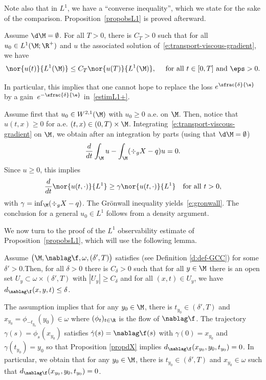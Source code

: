 Note also that in $L^1$, we have a ``converse inequality'', which we state for the sake of the comparison. Proposition~\ref{propobsL1} is proved afterward.
\begin{lemma}
\label{l:reverse-heat}
Assume $\d\M = \emptyset$. For all $T>0$, there is $C_T>0$ such that for all $u_0\in L^1(\M; \R^+)$ and $u$ the associated solution of~\eqref{e:transport-viscous-gradient}, we have
\begin{equation}
\label{e:gronwall}
\nor{u(t)}{L^1(\M)}\leq C_T \nor{u(T)}{L^1(\M)}, \quad \text{ for all } t \in [0,T] \text{ and }\eps >0.
\end{equation}
\end{lemma}
In particular, this implies that one cannot hope to replace the loss $e^{\sfrac{\delta}{\e}}$ by a gain~$e^{-\sfrac{\delta}{\e}}$ in~\eqref{estimL1+}.

Assume first that $u_0 \in W^{2,1}(\M)$ with $u_0\geq 0$ a.e. on $\M$. Then, notice that $u(t,x)\geq 0$ for a.e. $(t,x) \in (0,T) \times \M$.
Integrating~\eqref{e:transport-viscous-gradient} on $\M$, we obtain after an integration by parts (using that $\d\M = \emptyset$)
\[
\frac{d}{dt} \int_\M u - \int_\M (\div_gX - q ) u = 0.
\]
Since $u\geq 0$, this implies
\[
\frac{d}{dt} \nor{u(t,\cdot)}{L^1} \geq \gamma \nor{u(t,\cdot)}{L^1}\quad \text{for all }t>0,
\]
with $\gamma = \inf_\M (\div_gX - q )$. The Grönwall inequality yields~\eqref{e:gronwall}. The conclusion for a general $u_0 \in L^1$ follows from a density argument.
\enp

We now turn to the proof of the $L^1$ observability estimate of Proposition~\ref{propobsL1}, which will use the following lemma.
\begin{lemma}
\label{l:pourri}
Assume $\big( \M, \nablag\f,\omega,(\delta',T)\big)$ satisfies \pGCC (see Definition \ref{d:def-GCC}) for some $\delta'>0$.Then, for all $\delta>0$ there is $C_\delta>0$ such that for all $y \in \M$ there is an open set $U_y \subset \omega \times (\delta',T)$ with $|U_y| \geq C_\delta$ and for all $(x,t)\in U_y$, we have $d_{\nablag \f}(x,y,t)\leq \delta$.
\end{lemma}
The assumption \pGCC implies that for any $y_0 \in \M$, there is $t_{y_0} \in (\delta',T)$ and $x_{y_0}=\phi_{-t_{y_0}}(y_0) \in \omega$ where $(\phi_t)_{t\in \R}$ is the flow of $\nablag\f$. The trajectory $\gamma(s)=\phi_s(x_{y_0})$ satisfies $\dot{\gamma}(s)=\nablag\f(s)$ with $\gamma(0)=x_{y_0}$ and $\gamma(t_{y_0})=y_0$ so that Proposition \ref{propdX} implies $d_{\nablag\f}(x_{y_0},y_0,t_{y_0})=0$. In particular, we obtain that for any $y_0 \in \M$, there is $t_{y_0} \in (\delta',T)$ and $x_{y_0} \in \omega$ such that $d_{\nablag\f}(x_{y_0},y_0,t_{y_0})=0$.

